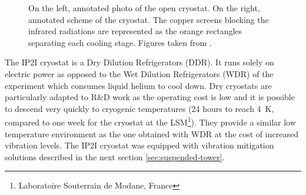 \begin{figure}
\begin{minipage}{0.48\textwidth}
\end{minipage}
\caption{On the left, annotated photo of the open cryostat. On the right, annotated scheme of the cryostat. The copper screens blocking the infrared radiations are represented as the orange rectangles separating each cooling stage. Figures taken from \cite{Maisonobe:2018tbq}.}
\label{fig:cryo-photo} 
\end{figure}

The IP2I cryostat is a Dry Dilution Refrigerators (DDR). It runs solely on electric power as opposed to the Wet Dilution Refrigerators (WDR) of the \Edelweiss{} experiment which consumes liquid helium to cool down. Dry cryostats are particularly adapted to R\&D work as the operating cost is low and it is possible to descend very quickly to cryogenic temperatures (24 hours to reach \SI{4}{\kelvin}, compared to one week for the \Edelweiss cryostat at the LSM\footnote{Laboratoire Souterrain de Modane, France}). They provide a similar low temperature environment as the one obtained with WDR at the cost of increased vibration levels. The IP2I cryostat was equipped with vibration mitigation solutions described in the next section \ref{sec:suspended-tower}.

